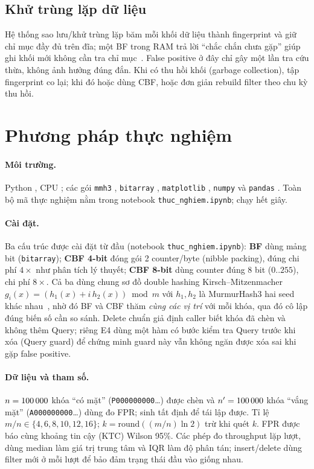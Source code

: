 \documentclass[11pt,a4paper]{article}
\begin{document}
\subsection{Khử trùng lặp dữ liệu}
Hệ thống sao lưu/khử trùng lặp băm mỗi khối dữ liệu thành fingerprint và
giữ chỉ mục đầy đủ trên đĩa; một BF trong RAM trả lời ``chắc chắn chưa
gặp'' giúp ghi khối mới không cần tra chỉ mục~\cite{broder2004}. False
positive ở đây chỉ gây một lần tra cứu thừa, không ảnh hưởng đúng đắn. Khi
có thu hồi khối (garbage collection), tập fingerprint co lại; khi đó hoặc dùng
CBF, hoặc đơn giản rebuild filter theo chu kỳ thu hồi.

\section{Phương pháp thực nghiệm}
\label{sec:method}
\paragraph{Môi trường.} Python \EnvPython{}, CPU \EnvCPU{}; các gói
\texttt{mmh3} \EnvMmhThree{}, \texttt{bitarray} \EnvBitarray{},
\texttt{matplotlib} \EnvMatplotlib{}, \texttt{numpy} \EnvNumpy{} và
\texttt{pandas} \EnvPandas{}. Toàn bộ mã thực nghiệm nằm trong notebook
\texttt{thuc\_nghiem.ipynb}; chạy hết \RuntimeSec{} giây.

\paragraph{Cài đặt.} Ba cấu trúc được cài đặt từ đầu
(notebook \texttt{thuc\_nghiem.ipynb}): \textbf{BF} dùng mảng bit
(\texttt{bitarray}); \textbf{CBF 4-bit} đóng gói 2 counter/byte (nibble
packing), đúng chi phí $4\times$ như phân tích lý thuyết; \textbf{CBF
8-bit} dùng counter đúng 8 bit ($0..255$), chi phí $8\times$. Cả ba dùng
chung sơ đồ double hashing Kirsch--Mitzenmacher
$g_i(x)=(h_1(x)+i\,h_2(x)) \bmod m$ với $h_1,h_2$ là MurmurHash3 hai seed
khác nhau~\cite{kirsch2008}, nhờ đó BF và CBF thăm \emph{cùng các vị trí} với
mỗi khóa, qua đó cô lập đúng biến số cần so sánh. Delete chuẩn giả định caller
biết khóa đã chèn và không thêm Query; riêng E4 dùng một hàm có bước kiểm tra Query trước khi xóa (Query guard) để
chứng minh guard này vẫn không ngăn được xóa sai khi gặp false positive.

\paragraph{Dữ liệu và tham số.} $n=100\,000{}$ khóa ``có mặt''
(\texttt{P000000000}\dots) được chèn và $n'=100\,000{}$ khóa ``vắng mặt''
(\texttt{A000000000}\dots) dùng đo FPR; sinh tất định để tái lập được. Tỉ lệ
$m/n\in\{4,6,8,10,12,16\}$; $k=\mathrm{round}((m/n)\ln 2)$ trừ khi quét $k$.
FPR được báo cùng khoảng tin cậy (KTC) Wilson 95\%. Các phép đo throughput lặp
\BenchRepeats{} lượt, dùng median làm giá trị trung tâm và IQR làm độ phân tán;
insert/delete dùng filter mới ở mỗi lượt để bảo đảm trạng thái đầu vào giống
nhau.
\end{document}
